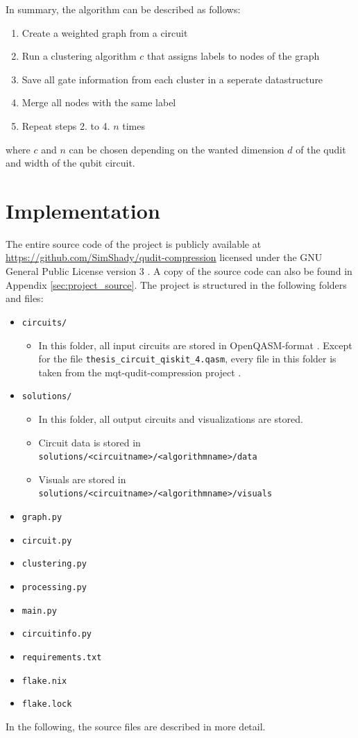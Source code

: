   In summary, the algorithm can be described as follows:
  \begin{enumerate}
    \item Create a weighted graph from a circuit
    \item Run a clustering algorithm $c$ that assigns labels to nodes of the graph
    \item Save all gate information from each cluster in a seperate datastructure
    \item Merge all nodes with the same label
    \item Repeat steps 2. to 4. $n$ times
  \end{enumerate}
  where $c$ and $n$ can be chosen depending on the wanted dimension $d$ of the qudit and width of the qubit circuit.
\section{Implementation} \label{sec:implementation}
  The entire source code of the project is publicly available at \url{https://github.com/SimShady/qudit-compression} licensed under the GNU General Public License version 3 \cite{gplv3}. A copy of the source code can also be found in Appendix \ref{sec:project_source}. The project is structured in the following folders and files:
  \begin{itemize}
    \item \texttt{circuits/}
    \begin{itemize}
      \item In this folder, all input circuits are stored in OpenQASM-format \cite{qasm}. Except for the file \texttt{thesis\_circuit\_qiskit\_4.qasm}, every file in this folder is taken from the mqt-qudit-compression project \cite{mato2023compression}.
    \end{itemize}
    \item \texttt{solutions/}
    \begin{itemize}
      \item In this folder, all output circuits and visualizations are stored.
      \item Circuit data is stored in \texttt{solutions/<circuitname>/<algorithmname>/data}
      \item Visuals are stored in \texttt{solutions/<circuitname>/<algorithmname>/visuals}
    \end{itemize}
    \item \texttt{graph.py}
    \item \texttt{circuit.py}
    \item \texttt{clustering.py}
    \item \texttt{processing.py}
    \item \texttt{main.py}
    \item \texttt{circuitinfo.py}
    \item \texttt{requirements.txt}
    \item \texttt{flake.nix}
    \item \texttt{flake.lock}
\end{itemize}
In the following, the source files are described in more detail.

